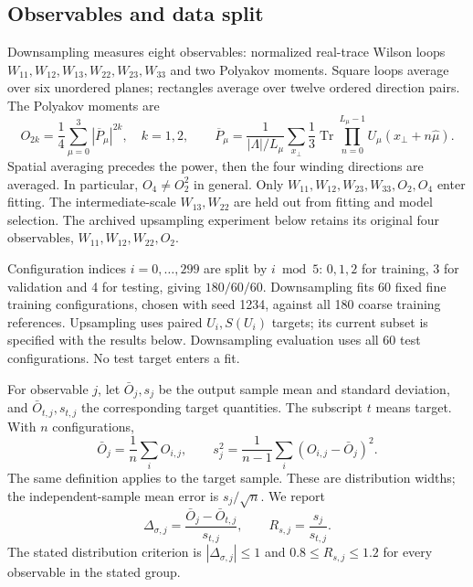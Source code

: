 \documentclass[aps,prd,superscriptaddress,nofootinbib,eqsecnum,floatfix,amsmath,longbibliography]{revtex4-2}
\newcommand{\Tr}{\operatorname{Tr}}
\begin{document}
\subsection{Observables and data split}
Downsampling measures eight observables: normalized real-trace Wilson loops
$W_{11},W_{12},W_{13},W_{22},W_{23},W_{33}$ and two Polyakov moments.
Square loops average over six unordered planes; rectangles average over
twelve ordered direction pairs. The Polyakov moments are
\begin{equation}
 O_{2k}=\frac14\sum_{\mu=0}^3|\overline P_\mu|^{2k},\quad k=1,2,\qquad
 \overline P_\mu=\frac{1}{|\Lambda|/L_\mu}\sum_{x_\perp}
 \frac13\Tr\prod_{n=0}^{L_\mu-1}U_\mu(x_\perp+n\hat\mu).
\end{equation}
Spatial averaging precedes the power, then the four winding directions
are averaged. In particular, $O_4\ne O_2^2$ in general.
Only $W_{11},W_{12},W_{23},W_{33},O_2,O_4$ enter fitting.
The intermediate-scale $W_{13},W_{22}$ are held out from fitting and model
selection. The archived upsampling experiment below retains its original
four observables, $W_{11},W_{12},W_{22},O_2$.

Configuration indices $i=0,\ldots,299$ are split by $i\bmod5$:
$0,1,2$ for training, 3 for validation and 4 for testing, giving
$180/60/60$. Downsampling fits 60 fixed fine training configurations,
chosen with seed 1234, against all 180 coarse training references.
Upsampling uses paired $U_i,S(U_i)$ targets; its current subset is specified
with the results below. Downsampling evaluation uses all 60 test configurations.
No test target enters a fit.

For observable $j$, let $\bar O_j,s_j$ be the output sample mean and
standard deviation, and $\bar O_{t,j},s_{t,j}$ the corresponding target
quantities. The subscript $t$ means target. With $n$ configurations,
\begin{equation}
 \bar O_j=\frac1n\sum_iO_{i,j},\qquad
 s_j^2=\frac1{n-1}\sum_i(O_{i,j}-\bar O_j)^2.
\end{equation}
The same definition applies to the target sample. These are distribution
widths; the independent-sample mean error is $s_j/\sqrt n$. We report
\begin{equation}
 \Delta_{\sigma,j}=\frac{\bar O_j-\bar O_{t,j}}{s_{t,j}},\qquad
 R_{s,j}=\frac{s_j}{s_{t,j}}.
 \label{eq:criteria}
\end{equation}
The stated distribution criterion is $|\Delta_{\sigma,j}|\le1$ and
$0.8\le R_{s,j}\le1.2$ for every observable in the stated group.
\end{document}
